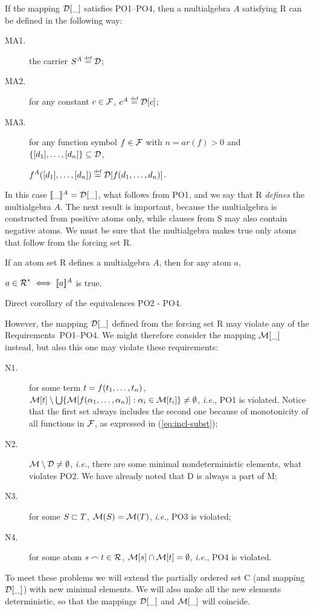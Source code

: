 If the mapping \(\C D[\_]\) satisfies PO1--PO4, then a multialgebra $A$
satisfying \C R can be defined in the following way:
\begin{description}
\item[MA1.] the carrier \(S^A\Def \C D\);
\item[MA2.] for any constant \(c\in\Funcs\), \(c^A\Def \C D[c]\);
\item[MA3.] for any function symbol \(f\in\Funcs\) with \(n=ar(f)>0\) and
\(\{[d_1] ,\ldots, [d_n]\}\subseteq\C D\), 

\(f^A([d_1] ,\ldots, [d_n])\Def \C D[f(\List dn,)]\).
\end{description}
In this case \(\Interpret\_=\C D[\_]\), what follows from PO1, and we say that
\C R {\em defines} the multialgebra $A$. The next result is important, because
the multialgebra is constructed from positive atoms only, while clauses from
\C S may also contain negative atoms. We must be sure that the multialgebra
makes true only atoms that follow from the forcing set \C R.

\begin{LEMMA} \label{le:MA-exact}
If an atom set \C R defines a multialgebra $A$, then for any atom $a$,
\begin{center}\MyLPar \(a\in\C R^\ast \iff \Interpret a\) is true.\end{center}
\end{LEMMA}
\begin{PROOF}
Direct corollary of the equivalences PO2 - PO4.  
\end{PROOF}

However, the mapping $\C D[\_]$ defined from the forcing set \C R may violate any
of the Requirements~PO1--PO4. We might therefore consider the mapping \(\C M[\_]\)
instead, but also this one may violate these requirements:
\begin{description}
\item[N1.] for some term \(t=f(\List tn,)\), \(\C M[t]\setminus 
\bigcup\{\C M[f(\List\alpha n,)]:\alpha_i\in \C M[t_i]\}\ne\es\),
{\em i.e.}, PO1 is violated. Notice that the first set
   always includes the second one because of monotonicity of all functions in
   \(\Funcs\), as expressed in (\ref{eq:incl-subst});
\item[N2.] \(\C M\setminus\C D\ne\es\), {\em i.e.}, there are some minimal
   nondeterministic elements, what violates PO2. We have already noted that \C
   D is always a part of \C M;
\item[N3.] for some \(S\Ein T\), \(\C M(S)=\C M(T)\), {\em i.e.}, PO3 is violated; 
\item[N4.] for some atom \(s\Int t\in\C R\), \(\C M[s]\cap\C M[t]=\es\), 
{\em i.e.}, PO4 is violated.
\end{description}
To meet these problems we will extend the partially ordered
set \C C (and mapping \(\C D[\_]\)) with new minimal elements. We will also
make all the new elements deterministic, so that the mappings \(\C D[\_]\) and
\(\C M[\_]\) will coincide.

